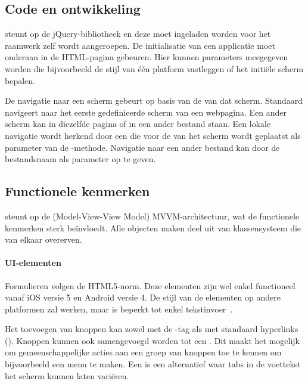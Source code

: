 \subsection{Code en ontwikkeling}
\kendo{} steunt op de jQuery-bibliotheek en deze moet ingeladen worden voor het \kendo{} raamwerk zelf wordt aangeroepen.
De initialisatie van een applicatie moet onderaan in de HTML-pagina gebeuren.	
Hier kunnen parameters meegegeven worden die bijvoorbeeld de stijl van één platform vastleggen of het initiële scherm bepalen.

De navigatie naar een scherm gebeurt op basis van de  van dat scherm.
Standaard navigeert \kendo{} naar het eerste gedefinieerde scherm van een webpagina.
Een ander scherm kan in diezelfde pagina of in een ander bestand staan.
Een lokale navigatie wordt herkend door een  die voor de  van het scherm wordt geplaatst als parameter van de -methode.
Navigatie naar een ander bestand kan door de bestandsnaam als parameter op te geven.

\subsection{Functionele kenmerken}
\label{sec:kendo-functioneel}
\kendo{} steunt op de (Model-View-View Model) MVVM-architectuur,  wat de functionele kenmerken sterk beïnvloedt.
Alle objecten maken deel uit van klassensysteem die van elkaar overerven.

\paragraph{UI-elementen}
Formulieren volgen de HTML5-norm. 
Deze elementen zijn wel enkel functioneel vanaf iOS versie 5 en Android versie 4.  
De stijl van de elementen op andere platformen zal werken, maar is beperkt tot enkel tekstinvoer~\cite{Telerike}.

Het toevoegen van knoppen kan zowel met de -tag als met standaard hyperlinks ().
Knoppen kunnen ook samengevoegd worden tot een .
Dit maakt het mogelijk om gemeenschappelijke acties aan een groep van knoppen toe te kennen om bijvoorbeeld een menu te maken.
Een  is een alternatief waar tabs in de voettekst het scherm kunnen laten variëren.

